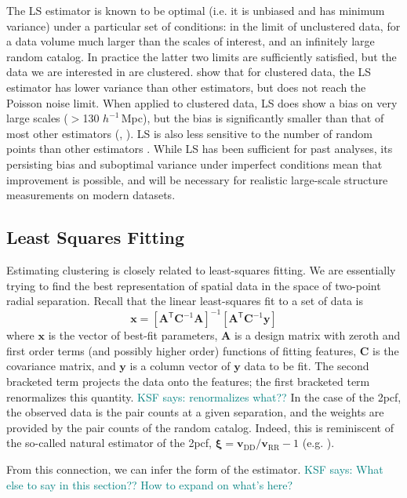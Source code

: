 \documentclass[modern]{aastex62}
\newcommand{\cf}{2pcf\xspace} %
\newcommand{\LS}{LS\xspace}
\newcommand{\inv}{^{-1}}
\newcommand{\T}{^{\mathsf{T}}}
\newcommand{\hmpc}{$h^{-1}\,$Mpc}
\newcommand{\bld}[1]{\bm{#1}} %
\newcommand{\vv}[1]{\bld{v}_\mathrm{#1}}
\newcommand{\KSF}[1]{\textcolor{teal}{KSF says: #1}}
\begin{document}
The \LS estimator is known to be optimal (i.e. it is unbiased and has minimum variance) under a particular set of conditions: in the limit of unclustered data, for a data volume much larger than the scales of interest, and an infinitely large random catalog. 
In practice the latter two limits are sufficiently satisfied, but the data we are interested in are clustered.
\cite{VargasMagana2013} show that for clustered data, the \LS estimator has lower variance than other estimators, but does not reach the Poisson noise limit.
When applied to clustered data, \LS does show a bias on very large scales ($>$130 \hmpc), but the bias is significantly smaller than that of most other estimators (\citealt{Kerscher1999}, \citealt{VargasMagana2013}).
\LS is also less sensitive to the number of random points than other estimators \citep{Kerscher2000}.
While \LS has been sufficient for past analyses, its persisting bias and suboptimal variance under imperfect conditions mean that improvement is possible, and will be necessary for realistic large-scale structure measurements on modern datasets.

\subsection{Least Squares Fitting}

Estimating clustering is closely related to least-squares fitting.
We are essentially trying to find the best representation of spatial data in the space of two-point radial separation.
Recall that the linear least-squares fit to a set of data is
\begin{equation}
\bld{x} = [\bld{A}\T \bld{C}\inv \bld{A}]\inv [\bld{A}\T \bld{C}\inv \bld{y}]
\end{equation}
where $\bld{x}$ is the vector of best-fit parameters, $\bld{A}$ is a design matrix with zeroth and first order terms (and possibly higher order) functions of fitting features, $\bld{C}$ is the covariance matrix, and $\bld{y}$ is a column vector of $\bld{y}$ data to be fit.
The second bracketed term projects the data onto the features; the first bracketed term renormalizes this quantity. \KSF{renormalizes what??}
In the case of the \cf, the observed data is the pair counts at a given separation, and the weights are provided by the pair counts of the random catalog.
Indeed, this is reminiscent of the so-called natural estimator of the \cf, $\bld{\xi} = \vv{DD}/\vv{RR} - 1$ (e.g. \citealt{Kerscher2000}).

From this connection, we can infer the form of the estimator.
\KSF{What else to say in this section?? How to expand on what's here?}
\end{document}
